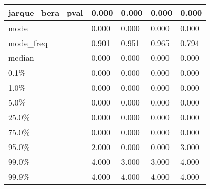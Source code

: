 \begin{table}[H]
\begin{tabular}{|l|m{10em}|m{10em}|m{10em}|m{10em}|}
\hline jarque\_bera\_pval & 0.000 & 0.000 & 0.000 & 0.000 \\
\hline mode & 0.000 & 0.000 & 0.000 & 0.000 \\
\hline mode\_freq & 0.901 & 0.951 & 0.965 & 0.794 \\
\hline median & 0.000 & 0.000 & 0.000 & 0.000 \\
\hline 0.1\% & 0.000 & 0.000 & 0.000 & 0.000 \\
\hline 1.0\% & 0.000 & 0.000 & 0.000 & 0.000 \\
\hline 5.0\% & 0.000 & 0.000 & 0.000 & 0.000 \\
\hline 25.0\% & 0.000 & 0.000 & 0.000 & 0.000 \\
\hline 75.0\% & 0.000 & 0.000 & 0.000 & 0.000 \\
\hline 95.0\% & 2.000 & 0.000 & 0.000 & 3.000 \\
\hline 99.0\% & 4.000 & 3.000 & 3.000 & 4.000 \\
\hline 99.9\% & 4.000 & 4.000 & 4.000 & 4.000 \\
\hline
\end{tabular}
\end{table}
